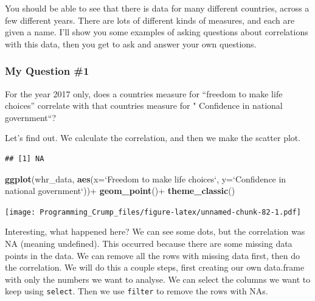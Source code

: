 \documentclass[]{book}
\newenvironment{Shaded}{\begin{snugshade}}{\end{snugshade}}
\newcommand{\KeywordTok}[1]{\textcolor[rgb]{0.13,0.29,0.53}{\textbf{{#1}}}}
\newcommand{\DataTypeTok}[1]{\textcolor[rgb]{0.13,0.29,0.53}{{#1}}}
\newcommand{\StringTok}[1]{\textcolor[rgb]{0.31,0.60,0.02}{{#1}}}
\newcommand{\NormalTok}[1]{{#1}}
\theoremstyle{definition}
\theoremstyle{definition}
\theoremstyle{definition}
\theoremstyle{remark}
\begin{document}
You should be able to see that there is data for many different
countries, across a few different years. There are lots of different
kinds of measures, and each are given a name. I'll show you some
examples of asking questions about correlations with this data, then you
get to ask and answer your own questions.

\subsubsection{My Question \#1}\label{my-question-1}

For the year 2017 only, does a countries measure for ``freedom to make
life choices'' correlate with that countries measure for " Confidence in
national government``?

Let's find out. We calculate the correlation, and then we make the
scatter plot.

\begin{Shaded}
\end{Shaded}

\begin{verbatim}
## [1] NA
\end{verbatim}

\begin{Shaded}
\begin{Highlighting}[]
\KeywordTok{ggplot}\NormalTok{(whr_data, }\KeywordTok{aes}\NormalTok{(}\DataTypeTok{x=}\StringTok{`}\DataTypeTok{Freedom to make life choices}\StringTok{`}\NormalTok{,}
                     \DataTypeTok{y=}\StringTok{`}\DataTypeTok{Confidence in national government}\StringTok{`}\NormalTok{))+}
\StringTok{  }\KeywordTok{geom_point}\NormalTok{()+}
\StringTok{  }\KeywordTok{theme_classic}\NormalTok{()}
\end{Highlighting}
\end{Shaded}

\texttt{[image: Programming\_Crump\_files/figure-latex/unnamed-chunk-82-1.pdf]}

Interesting, what happened here? We can see some dots, but the
correlation was NA (meaning undefined). This occurred because there are
some missing data points in the data. We can remove all the rows with
missing data first, then do the correlation. We will do this a couple
steps, first creating our own data.frame with only the numbers we want
to analyse. We can select the columns we want to keep using
\texttt{select}. Then we use \texttt{filter} to remove the rows with
NAs.
\end{document}
